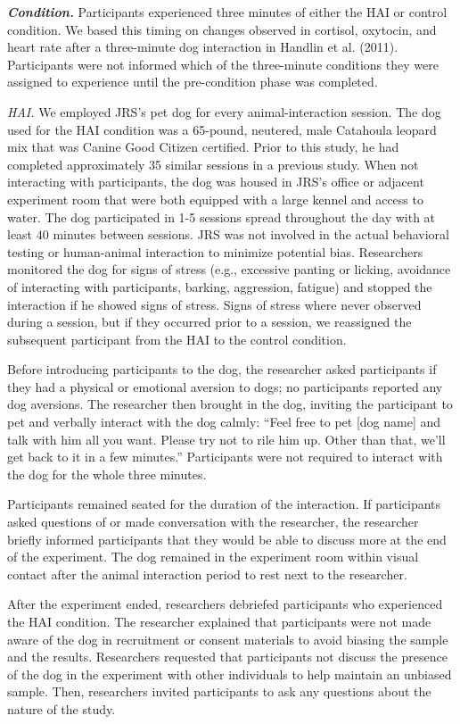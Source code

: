 \documentclass[
  english,
  pub,floatsintext]{apa6}
\begin{document}
\textbf{\emph{Condition.}}
Participants experienced three minutes of either the HAI or control condition. We based this timing on changes observed in cortisol, oxytocin, and heart rate after a three-minute dog interaction in Handlin et al. (2011). Participants were not informed which of the three-minute conditions they were assigned to experience until the pre-condition phase was completed.

\emph{HAI.} We employed JRS's pet dog for every animal-interaction session. The dog used for the HAI condition was a 65-pound, neutered, male Catahoula leopard mix that was Canine Good Citizen certified. Prior to this study, he had completed approximately 35 similar sessions in a previous study. When not interacting with participants, the dog was housed in JRS's office or adjacent experiment room that were both equipped with a large kennel and access to water. The dog participated in 1-5 sessions spread throughout the day with at least 40 minutes between sessions. JRS was not involved in the actual behavioral testing or human-animal interaction to minimize potential bias. Researchers monitored the dog for signs of stress (e.g., excessive panting or licking, avoidance of interacting with participants, barking, aggression, fatigue) and stopped the interaction if he showed signs of stress. Signs of stress where never observed during a session, but if they occurred prior to a session, we reassigned the subsequent participant from the HAI to the control condition.

Before introducing participants to the dog, the researcher asked participants if they had a physical or emotional aversion to dogs; no participants reported any dog aversions. The researcher then brought in the dog, inviting the participant to pet and verbally interact with the dog calmly: ``Feel free to pet {[}dog name{]} and talk with him all you want. Please try not to rile him up. Other than that, we'll get back to it in a few minutes.'' Participants were not required to interact with the dog for the whole three minutes.

Participants remained seated for the duration of the interaction. If participants asked questions of or made conversation with the researcher, the researcher briefly informed participants that they would be able to discuss more at the end of the experiment. The dog remained in the experiment room within visual contact after the animal interaction period to rest next to the researcher.

After the experiment ended, researchers debriefed participants who experienced the HAI condition. The researcher explained that participants were not made aware of the dog in recruitment or consent materials to avoid biasing the sample and the results. Researchers requested that participants not discuss the presence of the dog in the experiment with other individuals to help maintain an unbiased sample. Then, researchers invited participants to ask any questions about the nature of the study.
\end{document}
